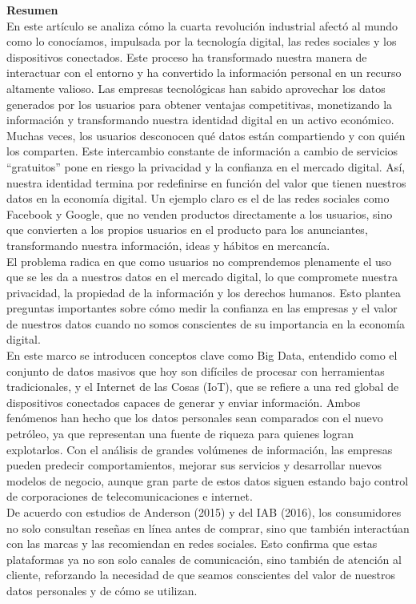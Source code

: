 \documentclass[12pt]{report}
\begin{document}
\begin{enumerate}[label=\textbf{\arabic*.}, leftmargin=*]
\begin{enumerate}[label=\textbf{\alph*.}, leftmargin=*, itemsep=1.0em]
\textbf{Resumen}\\
En este artículo se analiza cómo la cuarta revolución industrial afectó al mundo como lo conocíamos, impulsada por la tecnología digital, las redes sociales y los dispositivos conectados. Este proceso ha transformado nuestra manera de interactuar con el entorno y ha convertido la información personal en un recurso altamente valioso. Las empresas tecnológicas han sabido aprovechar los datos generados por los usuarios para obtener ventajas competitivas, monetizando la información y transformando nuestra identidad digital en un activo económico.\\
Muchas veces, los usuarios desconocen qué datos están compartiendo y con quién los comparten. Este intercambio constante de información a cambio de servicios “gratuitos” pone en riesgo la privacidad y la confianza en el mercado digital. Así, nuestra identidad termina por redefinirse en función del valor que tienen nuestros datos en la economía digital. Un ejemplo claro es el de las redes sociales como Facebook y Google, que no venden productos directamente a los usuarios, sino que convierten a los propios usuarios en el producto para los anunciantes, transformando nuestra información, ideas y hábitos en mercancía.\\
El problema radica en que como usuarios no comprendemos plenamente el uso que se les da a nuestros datos en el mercado digital, lo que compromete nuestra privacidad, la propiedad de la información y los derechos humanos. Esto plantea preguntas importantes sobre cómo medir la confianza en las empresas y el valor de nuestros datos cuando no somos conscientes de su importancia en la economía digital.\\
En este marco se introducen conceptos clave como Big Data, entendido como el conjunto de datos masivos que hoy son difíciles de procesar con herramientas tradicionales, y el Internet de las Cosas (IoT), que se refiere a una red global de dispositivos conectados capaces de generar y enviar información. Ambos fenómenos han hecho que los datos personales sean comparados con el nuevo petróleo, ya que representan una fuente de riqueza para quienes logran explotarlos. Con el análisis de grandes volúmenes de información, las empresas pueden predecir comportamientos, mejorar sus servicios y desarrollar nuevos modelos de negocio, aunque gran parte de estos datos siguen estando bajo control de corporaciones de telecomunicaciones e internet.\\
De acuerdo con estudios de Anderson (2015) y del IAB (2016), los consumidores no solo consultan reseñas en línea antes de comprar, sino que también interactúan con las marcas y las recomiendan en redes sociales. Esto confirma que estas plataformas ya no son solo canales de comunicación, sino también de atención al cliente, reforzando la necesidad de que seamos conscientes del valor de nuestros datos personales y de cómo se utilizan.\\

\end{enumerate}
\end{enumerate}
\end{document}
